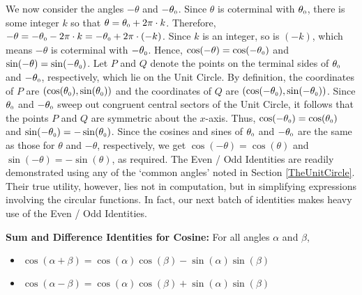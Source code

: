 We now consider the angles $-\theta$ and $-\theta_{\mbox{\tiny $0$}}$.  Since  $\theta$ is coterminal with $\theta_{\mbox{\tiny $0$}}$, there is some integer $k$ so that $\theta = \theta_{\mbox{\tiny $0$}} + 2\pi \cdot k$.  Therefore, $-\theta =   -\theta_{\mbox{\tiny $0$}} - 2\pi \cdot k = -\theta_{\mbox{\tiny $0$}} + 2\pi \cdot(-k)$.  Since $k$ is an integer, so is $(-k)$, which means $-\theta$ is coterminal with $-\theta_{\mbox{\tiny $0$}}$.  Hence,  $\cos(-\theta) = \cos(-\theta_{\mbox{\tiny $0$}})$ and $\sin(-\theta) = \sin(-\theta_{\mbox{\tiny $0$}})$.  Let $P$ and $Q$ denote the points on the terminal sides of $\theta_{\mbox{\tiny $0$}}$ and $-\theta_{\mbox{\tiny $0$}}$, respectively, which lie on the Unit Circle. By definition, the coordinates of $P$ are $(\cos(\theta_{\mbox{\tiny $0$}}),\sin(\theta_{\mbox{\tiny $0$}}))$ and the coordinates of $Q$ are $(\cos(-\theta_{\mbox{\tiny $0$}}),\sin(-\theta_{\mbox{\tiny $0$}}))$.  Since $\theta_{\mbox{\tiny $0$}}$ and $-\theta_{\mbox{\tiny $0$}}$ sweep out congruent central sectors of the Unit Circle, it follows that the points $P$ and $Q$ are symmetric about the $x$-axis.  Thus, $\cos(-\theta_{\mbox{\tiny $0$}}) = \cos(\theta_{\mbox{\tiny $0$}})$ and $\sin(-\theta_{\mbox{\tiny $0$}}) = -\sin(\theta_{\mbox{\tiny $0$}})$. Since the cosines and sines of $\theta_{\mbox{\tiny $0$}}$ and $-\theta_{\mbox{\tiny $0$}}$ are the same as those for $\theta$ and $-\theta$, respectively, we get $\cos(-\theta) = \cos(\theta)$ and $\sin(-\theta) = -\sin(\theta)$, as required. The Even / Odd Identities are readily demonstrated using any of the `common angles' noted in Section \ref{TheUnitCircle}.  Their true utility, however, lies not in computation, but in simplifying expressions involving the circular functions.  In fact, our next batch of identities makes heavy use of the Even / Odd Identities.

\smallskip

\colorbox{ResultColor}{\bbm

\begin{thm} \label{cosinesumdifference}  \textbf{Sum and Difference Identities for Cosine:} For all angles $\alpha$ and $\beta$,  

\begin{itemize}

\item  $\cos(\alpha + \beta) = \cos(\alpha) \cos(\beta) - \sin(\alpha) \sin(\beta)$

\item $\cos(\alpha - \beta) = \cos(\alpha) \cos(\beta) + \sin(\alpha) \sin(\beta)$

\end{itemize}

\end{thm}

\ebm}

